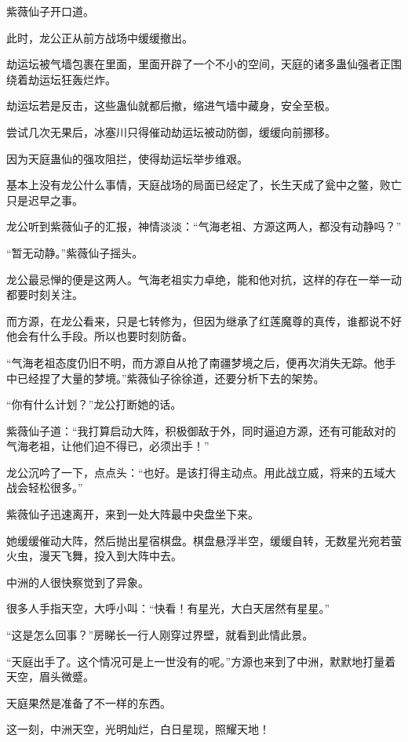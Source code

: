 \begin{this_body}
紫薇仙子开口道。

此时，龙公正从前方战场中缓缓撤出。

劫运坛被气墙包裹在里面，里面开辟了一个不小的空间，天庭的诸多蛊仙强者正围绕着劫运坛狂轰烂炸。

劫运坛若是反击，这些蛊仙就都后撤，缩进气墙中藏身，安全至极。

尝试几次无果后，冰塞川只得催动劫运坛被动防御，缓缓向前挪移。

因为天庭蛊仙的强攻阻拦，使得劫运坛举步维艰。

基本上没有龙公什么事情，天庭战场的局面已经定了，长生天成了瓮中之鳖，败亡只是迟早之事。

龙公听到紫薇仙子的汇报，神情淡淡：“气海老祖、方源这两人，都没有动静吗？”

“暂无动静。”紫薇仙子摇头。

龙公最忌惮的便是这两人。气海老祖实力卓绝，能和他对抗，这样的存在一举一动都要时刻关注。

而方源，在龙公看来，只是七转修为，但因为继承了红莲魔尊的真传，谁都说不好他会有什么手段。所以也要时刻防备。

“气海老祖态度仍旧不明，而方源自从抢了南疆梦境之后，便再次消失无踪。他手中已经捏了大量的梦境。”紫薇仙子徐徐道，还要分析下去的架势。

“你有什么计划？”龙公打断她的话。

紫薇仙子道：“我打算启动大阵，积极御敌于外，同时逼迫方源，还有可能敌对的气海老祖，让他们迫不得已，必须出手！”

龙公沉吟了一下，点点头：“也好。是该打得主动点。用此战立威，将来的五域大战会轻松很多。”

紫薇仙子迅速离开，来到一处大阵最中央盘坐下来。

她缓缓催动大阵，然后抛出星宿棋盘。棋盘悬浮半空，缓缓自转，无数星光宛若萤火虫，漫天飞舞，投入到大阵中去。

中洲的人很快察觉到了异象。

很多人手指天空，大呼小叫：“快看！有星光，大白天居然有星星。”

“这是怎么回事？”房睇长一行人刚穿过界壁，就看到此情此景。

“天庭出手了。这个情况可是上一世没有的呢。”方源也来到了中洲，默默地打量着天空，眉头微蹙。

天庭果然是准备了不一样的东西。

这一刻，中洲天空，光明灿烂，白日星现，照耀天地！

\end{this_body}

